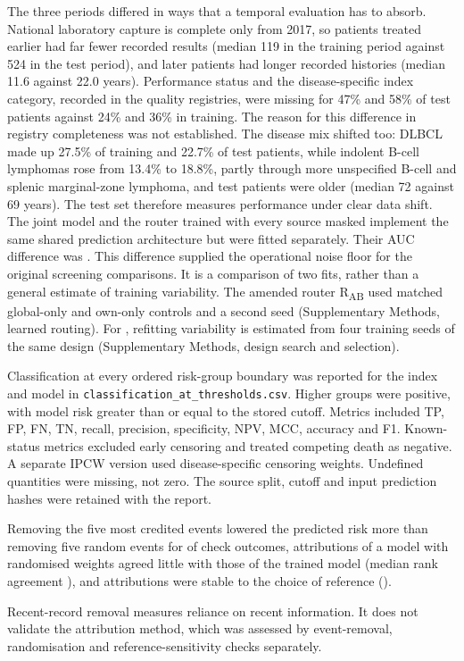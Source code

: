 The three periods differed in ways that a temporal evaluation has to absorb.
National laboratory capture is complete only from 2017, so patients treated
earlier had far fewer recorded results (median 119 in the training period
against 524 in the test period), and later patients had longer recorded
histories (median 11.6 against 22.0 years). Performance status and the
disease-specific index category, recorded in the quality registries, were
missing for 47\% and 58\% of test patients against 24\% and 36\% in training.
The reason for this difference in registry completeness was not established. The
disease mix shifted too: DLBCL made up 27.5\% of training and 22.7\% of test
patients, while indolent B-cell lymphomas rose from 13.4\% to 18.8\%, partly
through more unspecified B-cell and splenic marginal-zone lymphoma, and test
patients were older (median 72 against 69 years). The test set therefore
measures performance under clear data shift.
The joint model and the router trained with every source masked implement the
same shared prediction architecture but were fitted separately. Their AUC
difference was . This difference supplied the operational
noise floor for the original screening comparisons. It is a comparison of two
fits, rather than a general estimate of training variability. The amended
router R\textsubscript{AB} used matched global-only and own-only controls and a
second seed (Supplementary Methods, learned routing). For \opera{}, refitting variability
is estimated from four training seeds of the same design
(Supplementary Methods, design search and selection).

Classification at every ordered risk-group boundary was reported for the index
and model in \texttt{classification\_at\_thresholds.csv}. Higher groups were positive,
with model risk greater than or equal to the stored cutoff. Metrics included
TP, FP, FN, TN, recall, precision, specificity, NPV, MCC, accuracy and F1.
Known-status metrics excluded early censoring and treated competing death as
negative. A separate IPCW version used disease-specific censoring weights.
Undefined quantities were missing, not zero. The source split, cutoff and input
prediction hashes were retained with the report.

Removing the five most credited events lowered the predicted risk more than
removing five random events for  of
 check outcomes, attributions of a model with
randomised weights agreed little with those of the trained model (median rank
agreement ), and attributions were stable to
the choice of reference ().

Recent-record removal measures reliance on recent information. It does not
validate the attribution method, which was assessed by event-removal,
randomisation and reference-sensitivity checks separately.
